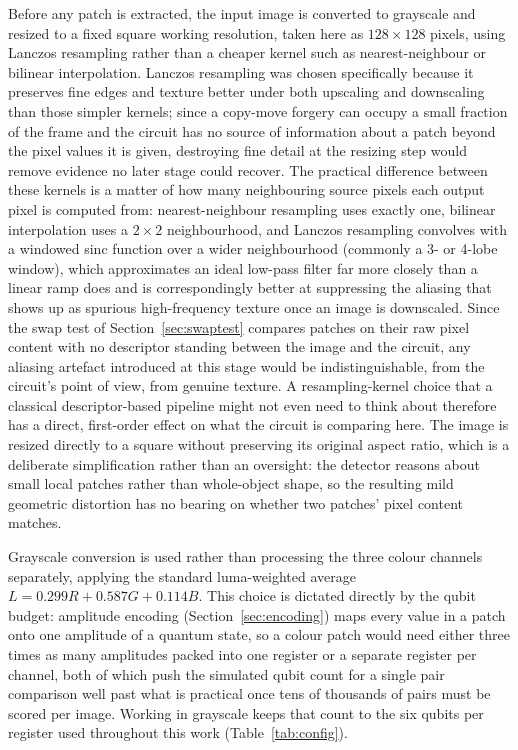 \documentclass[conference]{IEEEtran}
\begin{document}
Before any patch is extracted, the input image is converted to grayscale and resized to a fixed square working resolution, taken here as $128\times128$ pixels, using Lanczos resampling rather than a cheaper kernel such as nearest-neighbour or bilinear interpolation. Lanczos resampling was chosen specifically because it preserves fine edges and texture better under both upscaling and downscaling than those simpler kernels; since a copy-move forgery can occupy a small fraction of the frame and the circuit has no source of information about a patch beyond the pixel values it is given, destroying fine detail at the resizing step would remove evidence no later stage could recover. The practical difference between these kernels is a matter of how many neighbouring source pixels each output pixel is computed from: nearest-neighbour resampling uses exactly one, bilinear interpolation uses a $2\times2$ neighbourhood, and Lanczos resampling convolves with a windowed sinc function over a wider neighbourhood (commonly a 3- or 4-lobe window), which approximates an ideal low-pass filter far more closely than a linear ramp does and is correspondingly better at suppressing the aliasing that shows up as spurious high-frequency texture once an image is downscaled. Since the swap test of Section~\ref{sec:swaptest} compares patches on their raw pixel content with no descriptor standing between the image and the circuit, any aliasing artefact introduced at this stage would be indistinguishable, from the circuit's point of view, from genuine texture. A resampling-kernel choice that a classical descriptor-based pipeline might not even need to think about therefore has a direct, first-order effect on what the circuit is comparing here. The image is resized directly to a square without preserving its original aspect ratio, which is a deliberate simplification rather than an oversight: the detector reasons about small local patches rather than whole-object shape, so the resulting mild geometric distortion has no bearing on whether two patches' pixel content matches.

Grayscale conversion is used rather than processing the three colour channels separately, applying the standard luma-weighted average $L = 0.299R + 0.587G + 0.114B$. This choice is dictated directly by the qubit budget: amplitude encoding (Section~\ref{sec:encoding}) maps every value in a patch onto one amplitude of a quantum state, so a colour patch would need either three times as many amplitudes packed into one register or a separate register per channel, both of which push the simulated qubit count for a single pair comparison well past what is practical once tens of thousands of pairs must be scored per image. Working in grayscale keeps that count to the six qubits per register used throughout this work (Table~\ref{tab:config}).
\end{document}
